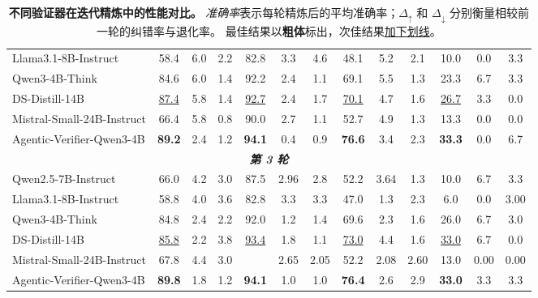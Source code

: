 \documentclass[11pt]{article}
\begin{document}
\begin{table}[t]
{\begin{tabular}{l|cccccccccccc}
Llama3.1-8B-Instruct
& 58.4 & 6.0 & 2.2
& 82.8 & 3.3 & 4.6
& 48.1 & 5.2 & 2.1
& 10.0 & 0.0 & 3.3 \\

Qwen3-4B-Think
& 84.6 & 6.0 & 1.4
& 92.2 & 2.4 & 1.1
& 69.1 & 5.5 & 1.3
& 23.3 & 6.7 & 3.3 \\

DS-Distill-14B
& \underline{87.4} & 5.8 & 1.4
& \underline{92.7} & 2.4 & 1.7
& \underline{70.1} & 4.7 & 1.6
& \underline{26.7} & 3.3 & 0.0 \\

Mistral-Small-24B-Instruct
& 66.4 & 5.8 & 0.8
& 90.0 & 2.7 & 1.1
& 52.7 & 4.9 & 1.3
& 13.3 & 0.0 & 0.0 \\

Agentic-Verifier-Qwen3-4B
& \textbf{89.2} & 2.4 & 1.2
& \textbf{94.1} & 0.4 & 0.9
& \textbf{76.6} & 3.4 & 2.3
& \textbf{33.3} & 0.0 & 6.7 \\
        \midrule
            \multicolumn{13}{c}{\textit{\textbf{第 3 轮}}} \\
        \midrule
        Qwen2.5-7B-Instruct
& 66.0 & 4.2 & 3.0
& 87.5 & 2.96 & 2.8
& 52.2 & 3.64 & 1.3
& 10.0 & 6.7 & 3.3 \\

Llama3.1-8B-Instruct
& 58.8 & 4.0 & 3.6
& 82.8 & 3.3 & 3.3
& 47.0 & 1.3 & 2.3
& 6.0 & 0.0 & 3.00 \\

Qwen3-4B-Think
& 84.8 & 2.4 & 2.2
& 92.0 & 1.2 & 1.4
& 69.6 & 2.3 & 1.6
& 26.0 & 6.7 & 3.0 \\

DS-Distill-14B
& \underline{85.8} & 2.2 & 3.8
& \underline{93.4} & 1.8 & 1.1
& \underline{73.0} & 4.4 & 1.6
& \underline{33.0} & 6.7 & 0.0 \\

Mistral-Small-24B-Instruct
& 67.8 & 4.4 & 3.0
& \cellcolor{lightgreen1}{90.6} & 2.65 & 2.05
& 52.2 & 2.08 & 2.60
& 13.0 & 0.00 & 0.00 \\

Agentic-Verifier-Qwen3-4B
& \textbf{89.8} & 1.8 & 1.2
& \textbf{94.1} & 1.0 & 1.0
& \textbf{76.4} & 2.6 & 2.9
& \textbf{33.0} & 3.3 & 3.3 \\
        \bottomrule[1.6pt]
    \end{tabular}
    }
\caption{\textbf{不同验证器在迭代精炼中的性能对比。}
\textit{准确率}表示每轮精炼后的平均准确率；$\Delta_\uparrow$ 和 $\Delta_\downarrow$ 分别衡量相较前一轮的纠错率与退化率。
最佳结果以\textbf{粗体}标出，次佳结果\underline{加下划线}。
}
\label{Tab:Main_Exp_Refine}
\vspace{-2mm}
\end{table}
\end{document}

